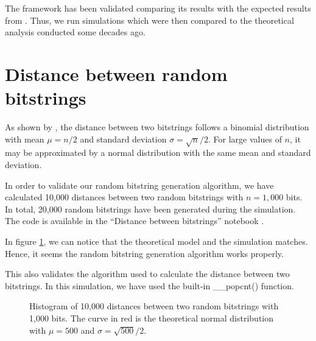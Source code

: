 
The framework has been validated comparing its results with the expected results from \citet{Kanerva1988}. Thus, we run simulations which were then compared to the theoretical analysis conducted some decades ago.

\section{Distance between random bitstrings}

As shown by \citet{Kanerva1988}, the distance between two bitstrings follows a binomial distribution with mean $\mu = n/2$ and standard deviation $\sigma = \sqrt{n}/2$. For large values of $n$, it may be approximated by a normal distribution with the same mean and standard deviation.

In order to validate our random bitstring generation algorithm, we have calculated 10,000 distances between two random bitstrings with $n=1,000$ bits. In total, 20,000 random bitstrings have been generated during the simulation. The code is available in the ``Distance between bitstrings'' notebook \citep{sdmframework}.

In figure \ref{fig:validation-distance}, we can notice that the theoretical model and the simulation matches. Hence, it seems the random bitstring generation algorithm works properly.

This also validates the algorithm used to calculate the distance between two bitstrings. In this simulation, we have used the built-in \_\_popcnt() function.

\begin{figure}[!htb]
  \centering

  \caption{Histogram of 10,000 distances between two random bitstrings with 1,000 bits. The curve in red is the theoretical normal distribution with $\mu = 500$ and $\sigma = \sqrt{500}/2$.}
  \label{fig:validation-distance}
\end{figure}


